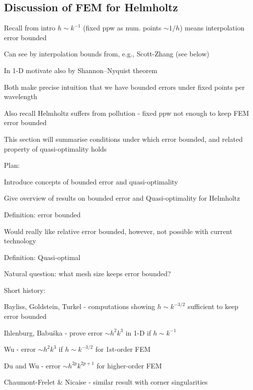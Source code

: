 \subsection{Discussion of FEM for Helmholtz}
\bit
\item Recall from intro $h\sim k^{-1}$ (fixed ppw as num. points $\sim 1/h$) means interpolation error bounded
\bit
\item Can see by interpolation bounds from, e.g., Scott-Zhang (see below)
\item In 1-D motivate also by Shannon--Nyquist theorem
\item Both make precise intuition that we have bounded errors under fixed points per wavelength
\eit
\item Also recall Helmholtz suffers from pollution - fixed ppw not enough to keep FEM error bounded
\item This section will summarise conditions under which error bounded, and related property of quasi-optimality holds
\item Plan:
\bit
\item Introduce concepts of bounded error and quasi-optimality
\item Give overview of results on bounded error and Quasi-optimality for Helmholtz
\eit
\eit
\bit
\item Definition: error bounded
\item Would really like relative error bounded, however, not possible with current technology
\item Definition: Quasi-optimal
\item Natural question: what mesh size keeps error bounded?
\item Short history:
\bit
\item Bayliss, Goldstein, Turkel - computations showing $h\sim k^{-3/2}$ sufficient to keep error bounded
\item Ihlenburg, Babu\v{s}ka - prove error $\sim h^2k^3$ in 1-D if $h \sim k^{-1}$
\item Wu - error $\sim h^2k^3$ if $h \sim k^{-3/2}$ for 1st-order FEM
\item Du and Wu - error $\sim h^{2p}k^{2p+1}$ for higher-order FEM
\item Chaumont-Frelet \& Nicaise - similar result with corner singularities
